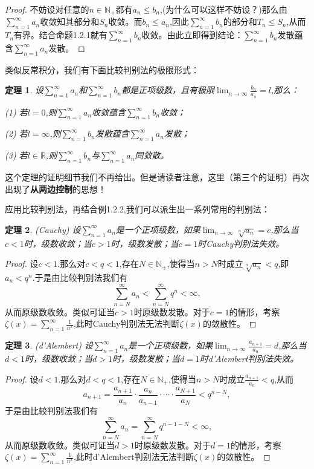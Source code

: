 \documentclass{article}
\newtheorem{theorem}{定理}[subsection]
\begin{document}
\begin{proof}
不妨设对任意的$n\in\mathbb{N}_+$都有$a_n\le b_n$,(为什么可以这样不妨设？)那么由$\sum_{n=1}^\infty a_n$收敛知其部分和$S_n$收敛。而$b_n\le a_n$,因此$\sum_{n=1}^\infty b_n$的部分和$T_n\le S_n$,从而$T_n$有界。结合命题1.2.1就有$\sum_{n=1}^\infty b_n$收敛。由此立即得到结论：$\sum_{n=1}^\infty b_n$发散蕴含$\sum_{n=1}^\infty a_n$发散。
\end{proof}
类似反常积分，我们有下面比较判别法的极限形式：
\begin{theorem}
设$\sum_{n=1}^\infty a_n$和$\sum_{n=1}^\infty b_n$都是正项级数，且有极限$\lim_{n\to\infty}\frac{b_n}{a_n}=l$,那么：\par
(1) 若$l=0$,则$\sum_{n=1}^\infty a_n$收敛蕴含$\sum_{n=1}^\infty b_n$收敛；\par
(2) 若$l=\infty$,则$\sum_{n=1}^\infty b_n$发散蕴含$\sum_{n=1}^\infty a_n$发散；\par
(3) 若$l\in\mathbb{R}$,则$\sum_{n=1}^\infty b_n$与$\sum_{n=1}^\infty a_n$同敛散。
\end{theorem}
这个定理的证明细节我们不再给出。但是请读者注意，这里（第三个的证明）再次出现了\textbf{从两边控制}的思想！\par
应用比较判别法，再结合例1.2.2,我们可以派生出一系列常用的判别法：
\begin{theorem}(Cauchy)
设$\sum_{n=1}^\infty a_n$是一个正项级数，如果$\lim_{n\rightarrow \infty} \sqrt[n]{a_n}=c$,那么当$c<1$时，级数收敛；当$c>1$时，级数发散；当$c=1$时Cauchy判别法失效。
\end{theorem}
\begin{proof}
设$c<1$.那么对$c<q<1$,存在$N\in\mathbb{N}_+$,使得当$n>N$时成立$\sqrt[n]{a_n}<q$,即$a_n<q^n$.于是由比较判别法我们有
$$\sum_{n=N}^\infty a_n<\sum_{n=N}^\infty q^n<\infty,$$
从而原级数收敛。类似可证当$c>1$时原级数发散。对于$c=1$的情形，考察$\zeta(x)=\sum_{n=1}^\infty\frac{1}{n^x}$,此时Cauchy判别法无法判断$\zeta(x)$的敛散性。
\end{proof}
\begin{theorem}(d'Alembert)
设$\sum_{n=1}^\infty a_n$是一个正项级数，如果$\lim_{n\rightarrow \infty} \frac{a_{n+1}}{a_n}=d$,那么当$d<1$时，级数收敛；当$d>1$时，级数发散；当$d=1$时d'Alembert判别法失效。
\end{theorem}
\begin{proof}
设$d<1$.那么对$d<q<1$,存在$N\in\mathbb{N}_+$,使得当$n>N$时成立$\frac{a_{n+1}}{a_n}<q$,从而
$$
a_{n+1}=\frac{a_{n+1}}{a_n}\cdot \frac{a_n}{a_{n-1}}\cdot \cdots \cdot \frac{a_{N+1}}{a_N}<q^{n-N},
$$
于是由比较判别法我们有
$$
\sum_{n=N}^{\infty}{a_n}=\sum_{n=N}^{\infty}{q^{n-1-N}}<\infty ,
$$
从而原级数收敛。类似可证当$d>1$时原级数发散。对于$d=1$的情形，考察$\zeta(x)=\sum_{n=1}^\infty\frac{1}{n^x}$,此时d'Alembert判别法无法判断$\zeta(x)$的敛散性。
\end{proof}
\end{document}
